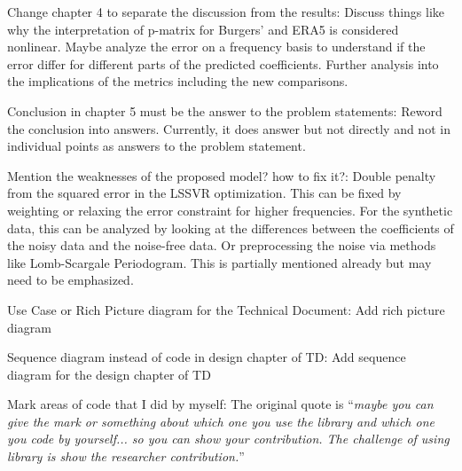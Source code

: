 \documentclass[a4paper,12pt]{scrreprt}
\begin{document}
\begin{numdesc}
    \item[Change chapter 4 to separate the discussion from the results:] Discuss things like why the interpretation of p-matrix for Burgers' and ERA5 is considered nonlinear. Maybe analyze the error on a frequency basis to understand if the error differ for different parts of the predicted coefficients. Further analysis into the implications of the metrics including the new comparisons.
    \item[Conclusion in chapter 5 must be the answer to the problem statements:] Reword the conclusion into answers. Currently, it does answer but not directly and not in individual points as answers to the problem statement.
    \item[Mention the weaknesses of the proposed model? how to fix it?:] Double penalty from the squared error in the LSSVR optimization. This can be fixed by weighting or relaxing the error constraint for higher frequencies. For the synthetic data, this can be analyzed by looking at the differences between the coefficients of the noisy data and the noise-free data. Or preprocessing the noise via methods like Lomb-Scargale Periodogram. This is partially mentioned already but may need to be emphasized.
    \item[Use Case or Rich Picture diagram for the Technical Document:] Add rich picture diagram
    \item[Sequence diagram instead of code in design chapter of TD:] Add sequence diagram for the design chapter of TD
    \item[Mark areas of code that I did by myself:] The original quote is \enquote{\emph{maybe you can give the mark or something about which one you use the library and which one you code by yourself... so you can show your contribution. The challenge of using library is show the researcher contribution.}}


\end{numdesc}
\end{document}
